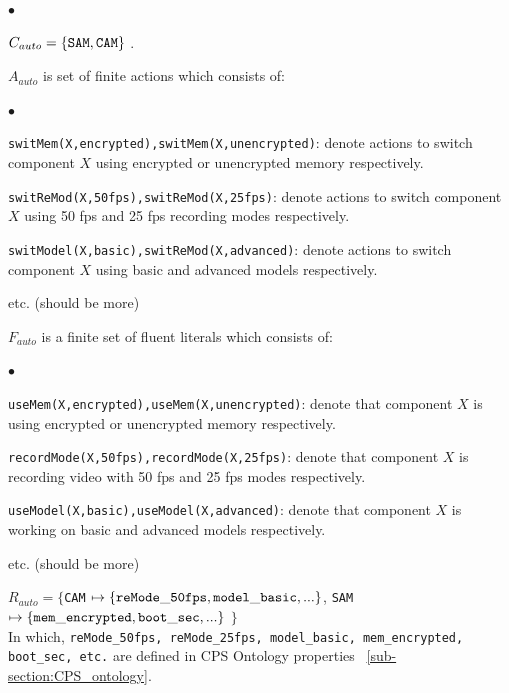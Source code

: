 \begin{list}{$\bullet$}{\itemsep=0pt \parsep=1pt \topsep=1pt \leftmargin=12pt} 
\item $C_{auto} = \{{\tt SAM}, {\tt CAM}\}$ .
\item $A_{auto}$ is set of finite actions which consists of:
\begin{list}{$\bullet$}{\itemsep=0pt \parsep=1pt \topsep=1pt \leftmargin=12pt} 
\item {\tt \small switMem(X,encrypted),switMem(X,unencrypted)}: denote actions to switch component $X$ using encrypted or unencrypted memory respectively. 
\item {\tt \small switReMod(X,50fps),switReMod(X,25fps)}: denote actions to switch component $X$ using 50 fps and 25 fps recording modes respectively. 
\item {\tt \small switModel(X,basic),switReMod(X,advanced)}: denote actions to switch component $X$ using basic and advanced models respectively. 
\item etc. (should be more)
\end{list}
\item $F_{auto}$ is a finite set of fluent literals which consists of:
\begin{list}{$\bullet$}{\itemsep=0pt \parsep=1pt \topsep=1pt \leftmargin=12pt} 
\item {\tt \small useMem(X,encrypted),useMem(X,unencrypted)}: denote that component $X$ is using encrypted or unencrypted memory respectively. 
\item {\tt \small recordMode(X,50fps),recordMode(X,25fps)}: denote that component $X$ is recording video with 50 fps and 25 fps modes respectively. 
\item {\tt \small useModel(X,basic),useModel(X,advanced)}: denote that component $X$ is working on basic and advanced models respectively. 
\item etc. (should be more)
\end{list}
\item $R_{auto} =\{${\tt CAM} $\mapsto \{{\tt reMode\_50fps, model\_basic,...}\}$, {\tt SAM} $\mapsto \{{\tt mem\_encrypted, boot\_sec,...}\}$  $\}$ \\
In which, {\tt \small reMode\_50fps, reMode\_25fps, model\_basic, mem\_encrypted, boot\_sec, etc.}  are defined in CPS Ontology properties ~\ref{sub-section:CPS_ontology}. 
\end{list}
